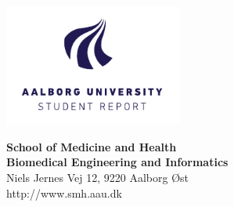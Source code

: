 {}
\thispagestyle{empty}

\begin{minipage}[t]{0.48\textwidth}
\vspace*{-25pt}			%
\includegraphics[height=4cm]{billeder/AAU-logo-stud-UK-RGB}
\end{minipage}
\hfill
\begin{minipage}[t]{0.48\textwidth}
{\small 
\textbf{%
School of Medicine and Health \\
Biomedical Engineering and Informatics}\\
Niels Jernes Vej 12, 9220 Aalborg Øst \\
http://www.smh.aau.dk}

\end{minipage}

\vspace*{1cm}

